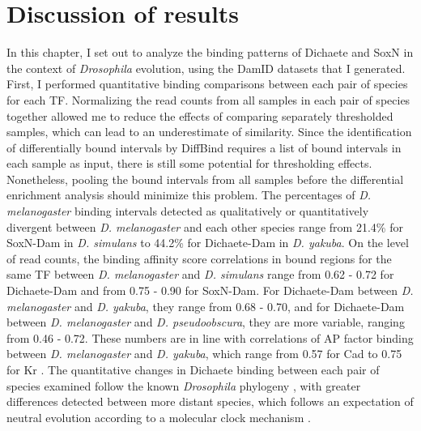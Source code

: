 \section{Discussion of results}
In this chapter, I set out to analyze the binding patterns of Dichaete and SoxN in the context of \emph{Drosophila} evolution, using the DamID datasets that I generated. First, I performed quantitative binding comparisons between each pair of species for each TF. Normalizing the read counts from all samples in each pair of species together allowed me to reduce the effects of comparing separately thresholded samples, which can lead to an underestimate of similarity. Since the identification of differentially bound intervals by DiffBind requires a list of bound intervals in each sample as input, there is still some potential for thresholding effects. Nonetheless, pooling the bound intervals from all samples before the differential enrichment analysis should minimize this problem. The percentages of \emph{D. melanogaster} binding intervals detected as qualitatively or quantitatively divergent between \emph{D. melanogaster} and each other species range from 21.4\% for SoxN-Dam in \emph{D. simulans} to 44.2\% for Dichaete-Dam in \emph{D. yakuba}. On the level of read counts, the binding affinity score correlations in bound regions for the same TF between \emph{D. melanogaster} and \emph{D. simulans} range from 0.62 - 0.72 for Dichaete-Dam and from 0.75 - 0.90 for SoxN-Dam. For Dichaete-Dam between \emph{D. melanogaster} and \emph{D. yakuba}, they range from 0.68 - 0.70, and for Dichaete-Dam between \emph{D. melanogaster} and \emph{D. pseudoobscura}, they are more variable, ranging from 0.46 - 0.72. These numbers are in line with correlations of AP factor binding between \emph{D. melanogaster} and \emph{D. yakuba}, which range from 0.57 for Cad to 0.75 for Kr \citep{bradley_binding_2010}. The quantitative changes in Dichaete binding between each pair of species examined follow the known \emph{Drosophila} phylogeny \citep{russo_molecular_1995}, with greater differences detected between more distant species, which follows an expectation of neutral evolution according to a molecular clock mechanism \citep{he_high_2011}.


